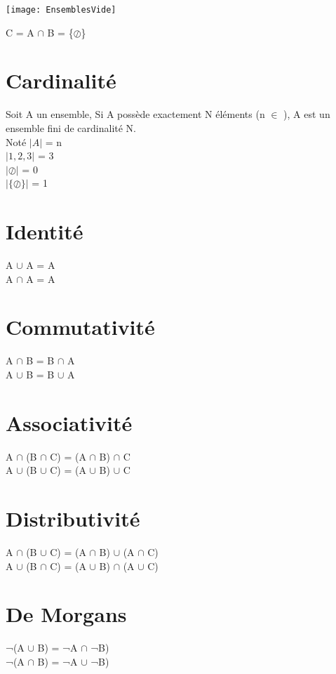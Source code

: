 \texttt{[image: EnsemblesVide]}
\vspace{3mm} %

C = A $\cap$ B = \{$\oslash$\}

\newpage
\section{Cardinalité}

Soit A un ensemble, Si A possède exactement N éléments (n $\in$ \N), A est un ensemble fini de cardinalité N.\\

Noté $|A|$ = n \\

$|1,2,3|$ = 3 \\

$|\oslash|$ = 0 \\

$|\{\oslash\}|$ = 1 \\

\section{Identité}

A $\cup$ A = A \\
A $\cap$ A = A \\

\section{Commutativité}

A $\cap$ B  = B $\cap$ A \\
A $\cup$ B  = B $\cup$ A \\

\section{Associativité}

A $\cap$ (B $\cap$ C) = (A $\cap$ B) $\cap$ C \\
A $\cup$ (B $\cup$ C) = (A $\cup$ B) $\cup$ C \\

\section{Distributivité}

A $\cap$ (B $\cup$ C) = (A $\cap$ B) $\cup$ (A $\cap$ C) \\
A $\cup$ (B $\cap$ C) = (A $\cup$ B) $\cap$ (A $\cup$ C) \\

\section{De Morgans}

¬(A $\cup$ B) = ¬A $\cap$ ¬B) \\
¬(A $\cap$ B) = ¬A $\cup$ ¬B) \\
